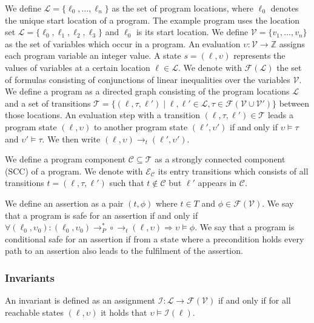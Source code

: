 \documentclass[12pt]{scrartcl}
\begin{document}
We define $\mathcal{L} = \lbrace \ell_0, \dots, \ell_n \rbrace$ as the set of program locations, where $\ell_0$ denotes the unique start location of a program.
The example program uses the location set $\mathcal{L} = \lbrace \ell_0 , \ell_1 , \ell_2 , \ell_3 \rbrace$ and $\ell_0$ is its start location.
We define $\mathcal{V} = \lbrace v_1, \dots, v_n \rbrace$ as the set of variables which occur in a program.
An evaluation $\upsilon: \mathcal{V} \rightarrow \mathbb{Z}$ assigns each program variable an integer value.
A state $s = (\ell, \upsilon)$ represents the values of variables at a certain location $\ell \in \mathcal{L}$.
We denote with $\mathcal{F}(\mathcal{L})$ the set of formulas consisting of conjunctions of linear inequalities over the variables $\mathcal{V}$.
We define a program as a directed graph consisting of the program locations $\mathcal{L}$ and a set of transitions $\mathcal{T} = \lbrace (\ell, \tau, \ell') \mid \ell, \ell' \in \mathcal{L}, \tau \in \mathcal{F}(\mathcal{V} \cup \mathcal{V}') \rbrace$ between those locations.
An evaluation step with a transition $(\ell, \tau, \ell') \in \mathcal{T}$ leads a program state $(\ell, \upsilon)$ to another program state $(\ell', \upsilon')$ if and only if $\upsilon \models \tau$ and $\upsilon' \models \tau$. We then write $(\ell, \upsilon) \rightarrow_t (\ell', \upsilon')$.

We define a program component $\mathcal{C} \subseteq \mathcal{T}$ as a strongly connected component (SCC) of a program. 
We denote with $\mathcal{E}_\mathcal{C}$ its entry transitions which consists of all transitions $t = (\ell, \tau, \ell')$ such that $t \notin \mathcal{C}$ but $\ell'$ appears in $\mathcal{C}$.

We define an assertion as a pair $(t, \phi)$ where $t \in T$ and $\phi \in \mathcal{F}(\mathcal{V})$.
We say that a program is safe for an assertion if and only if $\forall (\ell_0, \upsilon_0): (\ell_0, \upsilon_0) \rightarrow_P^* \circ \rightarrow_t (\ell, \upsilon) \Rightarrow \upsilon \models \phi$.
We say that a program is conditional safe for an assertion if from a state where a precondition holds every path to an assertion also leads to the fulfilment of the assertion.

\subsubsection{Invariants}

An invariant is defined as an assignment $\mathcal{I} : \mathcal{L} \rightarrow \mathcal{F}(\mathcal{V})$ if and only if for all reachable states $(\ell, \upsilon)$ it holds that $\upsilon \models \mathcal{I}(\ell)$.
\end{document}
